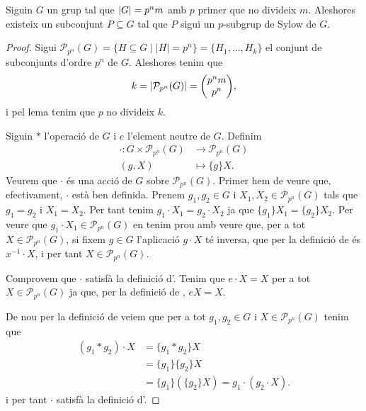 \documentclass[../Apunts.tex]{subfiles}
\begin{document}
	\begin{theorem}
		\label{thm:Primer Teorema de Sylow}
		Siguin \(G\) un grup tal que \(\abs{G}=p^{n}m\) amb \(p\) primer que no divideix \(m\). Aleshores existeix un subconjunt \(P\subseteq G\) tal que \(P\) sigui un \(p\)-subgrup de Sylow de \(G\).
		\begin{proof} %
			Sigui \(\mathcal{P}_{p^{n}}(G)=\{H\subseteq G\mid\lvert H\rvert=p^{n}\}=\{H_{1},\dots,H_{k}\}\) el conjunt de subconjunts d'ordre \(p^{n}\) de \(G\). Aleshores tenim que
			\begin{displaymath}
			k=\abs{\mathcal{P}_{p^{n}}(G)}=\left(\begin{matrix}p^{n}m\\p^{n}\end{matrix}\right),
			\end{displaymath}
			i pel lema  tenim que \(p\) no divideix \(k\). %
			
			Siguin \(\ast\) l'operació de \(G\) i \(e\) l'element neutre de \(G\). Definim
			\begin{align}\label{eq:thm:Primer Teorema de Sylow 1}
			\cdot\colon G\times\mathcal{P}_{p^{n}}(G)&\longrightarrow \mathcal{P}_{p^{n}}(G)\\
			(g,X)&\longmapsto\{g\}X.\nonumber
			\end{align}
			Veurem que \(\cdot\) és una acció de \(G\) sobre \(\mathcal{P}_{p^{n}}(G)\). Primer hem de veure que, efectivament, \(\cdot\) està ben definida. Prenem \(g_{1},g_{2}\in G\) i \(X_{1},X_{2}\in \mathcal{P}_{p^{n}}(G)\) tals que \(g_{1}=g_{2}\) i \(X_{1}=X_{2}\). Per tant tenim \(g_{1}\cdot X_{1}=g_{2}\cdot X_{2}\) ja que \(\{g_{1}\}X_{1}=\{g_{2}\}X_{2}\). Per veure que \(g_{1}\cdot X_{1}\in\mathcal{P}_{p^{n}}(G)\) en tenim prou amb veure que, per a tot \(X\in\mathcal{P}_{p^{n}}(G)\), si fixem \(g\in G\) l'aplicació \(g\cdot X\) té inversa, que per la definició de  és \(x^{-1}\cdot X\), i per tant \(X\in\mathcal{P}_{p^{n}}(G)\).
			
			Comprovem que \(\cdot\) satisfà la definició d'. Tenim que \(e\cdot X=X\) per a tot \(X\in\mathcal{P}_{p^{n}}(G)\) ja que, per la definició de , \(eX=X\).
			
			De nou per la definició de  veiem que per a tot \(g_{1},g_{2}\in G\) i \(X\in\mathcal{P}_{p^{n}}(G)\) tenim que \begin{align*}
			(g_{1}\ast g_{2})\cdot X&=\{g_{1}\ast g_{2}\}X\\
			&=\{g_{1}\}\{g_{2}\}X\\
			&=\{g_{1}\}(\{g_{2}\}X)=g_{1}\cdot(g_{2}\cdot X).
			\end{align*}
			i per tant \(\cdot\) satisfà la definició d'.
			

\end{proof}
\end{theorem}
\end{document}
